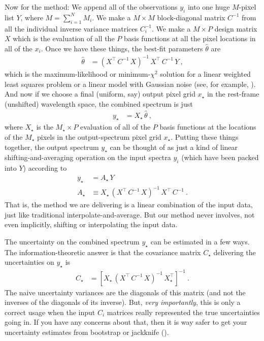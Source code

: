 \documentclass[modern]{aastex631}
\begin{document}
Now for the method:
We append all of the observations $y_i$ into one huge $M$-pixel list $Y$, where $M=\sum_{i=1}^N M_i$.
We make a $M\times M$ block-diagonal matrix $C^{-1}$ from all the individual inverse variance matrices $C_i^{-1}$.
We make a $M\times P$ design matrix $X$ which is the evaluation of all the $P$ basis functions at all the pixel locations in all of the $x_i$.
Once we have these things, the best-fit parameters $\hat\theta$ are
\begin{align}
    \hat\theta &= (X^\top\,C^{-1}\,X)^{-1}\,X^\top\,C^{-1}\,Y ~, \label{eq:xtxinvxty}
\end{align}
which is the maximum-likelihood or minimum-$\chi^2$ solution for a linear weighted least squares problem or a linear model with Gaussian noise (see, for example, \citealt{fitting}).
And now if we choose a final (uniform, say) output pixel grid $x_\star$ in the rest-frame (unshifted) wavelength space, the combined spectrum is just
\begin{align}
    y_\star &= X_\star\,\hat\theta ~,
\end{align}
where $X_\star$ is the $M_\star\times P$ evaluation of all of the $P$ basis functions at the locations of the $M_\star$ pixels in the output-spectrum pixel grid $x_\star$.
Putting these things together, the output spectrum $y_\star$ can be thought of as just a kind of linear shifting-and-averaging operation on the input spectra $y_i$ (which have been packed into $Y$) according to
\begin{align}
    y_\star &= A_\star\,Y \\
    A_\star &\equiv X_\star\,(X^\top\,C^{-1}\,X)^{-1}\,X^\top\,C^{-1} ~.
\end{align}
That is, the method we are delivering is a linear combination of the input data, just like traditional interpolate-and-average.
But our method never involves, not even implicitly, shifting or interpolating the input data.

The uncertainty on the combined spectrum $y_\star$ can be estimated in a few ways.
The information-theoretic answer is that the covariance matrix $C_\star$ delivering the uncertainties on $y_\star$ is
\begin{align}
    C_\star &= [X_\star\,(X^\top\,C^{-1}\,X)^{-1}\,X_\star^\top]^{-1} ~.
\end{align}
The naive uncertainty variances are the diagonals of this matrix (and not the inverses of the diagonals of its inverse).
But, \emph{very importantly}, this is only a correct usage when the input $C_i$ matrices really represented the true uncertainties going in.
If you have any concerns about that, then it is way safer to get your uncertainty estimates from bootstrap or jackknife (\citealt{fittingflexible}).
\end{document}
